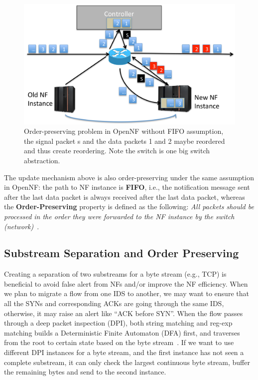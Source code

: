 \begin{figure}[ht]
\centering
\includegraphics[width=\linewidth]{figures/opennfbroke.pdf} 
\caption{\small Order-preserving problem in OpenNF without FIFO assumption, the signal packet s and the data packets 1 and 2 maybe reordered and thus create reordering. Note the switch is one big switch abstraction.}\label{opennfbroke}
\end{figure}


The update mechanism above is also order-preserving under the same assumption in OpenNF: the path to NF instance is \textbf{FIFO}, i.e., the notification message sent after the last data packet is always received after the last data packet, whereas the \textbf{Order-Preserving} property is defined as the following: \textit{All packets should be processed in the order they were forwarded to the NF instance by the switch (network)}~\cite{OpenNF}. 
 
\subsection{Substream Separation and Order Preserving}  
Creating a separation of two substreams for a byte stream (e.g., TCP) is beneficial to avoid false alert from NFs and/or improve the NF efficiency. When we plan to migrate a flow from one IDS to another, we may want to ensure that all the SYNs and corresponding ACKs are going through the same IDS, otherwise, it may raise an alert like ``ACK before SYN''. When the flow passes through a deep packet inspection (DPI), both string matching and reg-exp matching builds a Deterministic Finite Automaton (DFA) first, and traverses from the root to certain state based on the byte stream~\cite{aho, yaron}. If we want to use different DPI instances for a byte stream, and the first instance has not seen a complete substream, it can only check the largest continuous byte stream, buffer the remaining bytes and send to the second instance.  


